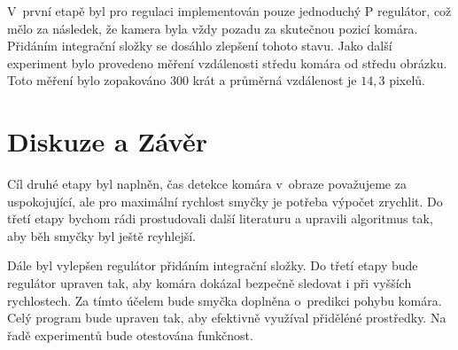 \documentclass[a4paper,10pt]{article}
\begin{document}
		V~první etapě byl pro regulaci implementován pouze jednoduchý P regulátor, což mělo za následek, 
		že kamera byla vždy pozadu za skutečnou pozicí komára. Přidáním integrační složky se dosáhlo zlepšení tohoto stavu. 
		Jako další experiment bylo provedeno měření vzdálenosti středu komára od středu obrázku. 
		Toto měření bylo zopakováno 300 krát a průměrná vzdálenost je $14,3 $ pixelů.



\section{Diskuze a Závěr}
		Cíl druhé etapy byl naplněn, čas detekce komára v~obraze považujeme za uspokojující, ale pro maximální rychlost smyčky je potřeba výpočet zrychlit. Do třetí etapy bychom rádi prostudovali další literaturu a upravili algoritmus tak, aby běh smyčky byl ještě rcyhlejší. 

		Dále byl vylepšen regulátor přidáním integrační složky. Do třetí etapy bude regulátor upraven tak, 
		aby komára dokázal bezpečně sledovat i při vyšších rychlostech.
		Za tímto účelem bude smyčka doplněna o~predikci pohybu komára. Celý program bude upraven tak, aby efektivně využíval přiděléné prostředky.
		Na řadě experimentů bude otestována funkčnost. 



\end{document}
